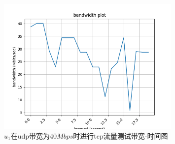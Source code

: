 \begin{figure}[h]
	\centering
	\includegraphics[width=0.8\textwidth]{image/u1-40.tcp.png}
	\caption{$u_1$在udp带宽为$40Mbps$时进行tcp流量测试带宽-时间图}
 	\label{fig:u140}
\end{figure}